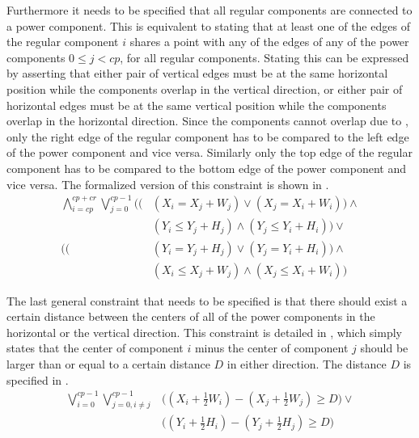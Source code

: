 Furthermore it needs to be specified that all regular components are connected to a power component. This is equivalent to stating that at least one of the edges of the regular component $i$ shares a point with any of the edges of any of the power components $0 \leq j < cp$, for all regular components. Stating this can be expressed by asserting that either pair of vertical edges must be at the same horizontal position while the components overlap in the vertical direction, or either pair of horizontal edges must be at the same vertical position while the components overlap in the horizontal direction. Since the components cannot overlap due to , only the right edge of the regular component has to be compared to the left edge of the power component and vice versa. Similarly only the top edge of the regular component has to be compared to the bottom edge of the power component and vice versa. The formalized version of this constraint is shown in .
\begin{equation}
  \label{eqn:2_power}
  \begin{aligned}
    \bigwedge_{i = cp}^{cp + cr}
      \bigvee_{j = 0}^{cp - 1}
        \Bigg(
          \Big(
           &(X_{i} = X_{j} + W_{j}) \vee
            (X_{j} = X_{i} + W_{i})
          \Big) \wedge \\
         &(Y_{i} \leq Y_{j} + H_{j}) \wedge
          (Y_{j} \leq Y_{i} + H_{i})
        \Bigg) \vee \\
        \Bigg(
          \Big(
           &(Y_{i} = Y_{j} + H_{j}) \vee
            (Y_{j} = Y_{i} + H_{i})
          \Big) \wedge \\
         &(X_{i} \leq X_{j} + W_{j}) \wedge
          (X_{j} \leq X_{i} + W_{i})
        \Bigg)
    \end{aligned}
\end{equation}

The last general constraint that needs to be specified is that there should exist a certain distance between the centers of all of the power components in the horizontal or the vertical direction. This constraint is detailed in , which simply states that the center of component $i$ minus the center of component $j$ should be larger than or equal to a certain distance $D$ in either direction. The distance $D$ is specified in .
\begin{equation}
  \label{eqn:2_dist}
  \begin{aligned}
    \bigvee_{i = 0}^{cp - 1}
      \bigvee_{j = 0, i \neq j}^{cp - 1}
        &\Big((X_{i} + \frac{1}{2}W_{i}) - (X_{j} + \frac{1}{2}W_{j}) \geq D\Big) \vee \\
        &\Big((Y_{i} + \frac{1}{2}H_{i}) - (Y_{j} + \frac{1}{2}H_{j}) \geq D\Big)
  \end{aligned}
\end{equation}

